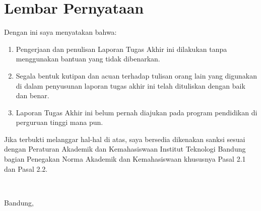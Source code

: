\clearpage

\chapter*{Lembar Pernyataan}

\par Dengan ini saya menyatakan bahwa:

\begin{enumerate}
    \item Pengerjaan dan penulisan Laporan Tugas Akhir ini dilakukan tanpa menggunakan bantuan yang tidak dibenarkan. 
    \item Segala bentuk kutipan dan acuan terhadap tulisan orang lain yang digunakan di dalam penyusunan laporan tugas akhir ini telah dituliskan dengan baik dan benar. 
    \item Laporan Tugas Akhir ini belum pernah diajukan pada program pendidikan di perguruan tinggi mana pun. 
\end{enumerate}

\par Jika terbukti melanggar hal-hal di atas, saya bersedia dikenakan sanksi sesuai dengan Peraturan Akademik dan Kemahasiswaan Institut Teknologi Bandung bagian Penegakan Norma Akademik dan Kemahasiswaan khususnya Pasal 2.1 dan Pasal 2.2. 

\mbox{}\\
\par Bandung, \thedate \\
\\
\\
\\
\\
\theauthor 

\clearpage
